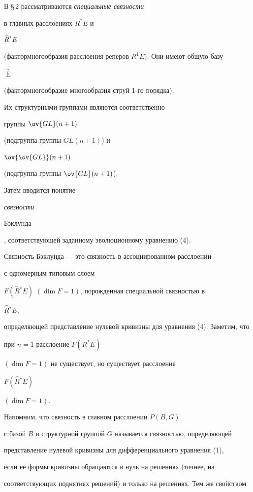 В \S\,2 рассматриваются {\it специальные связности} 


в главных расслоениях $R^*E$ и


$\overset{\frown}{R}{}^*E$


(фактормногообразия расслоения реперов $R^1 E$). Они имеют общую базу


$\mathop{J^1 E}\limits^*$


(фактормногообразие многообразия струй 1-го порядка). 


Их структурными группами являются соответственно


группы $\ov {GL} ({n+1})$


(подгруппа группы $GL ({n+1})$) и 


$\ov{\ov {GL}} ({n+1})$


(подгруппа группы $\ov {GL} ({n+1})$). 


Затем вводится понятие {\it связности


Бэклунда}, соответствующей заданному эволюционному уравнению (4).





Связность Бэклунда --- это связность в ассоциированном расслоении 


с одномерным типовым слоем


$F(\overset{\frown}{R}{}^ *


E)$ $({\dim F=1})$, порожденная специальной связностью в


$\overset{\frown}{R}{}^*E$,


определяющей представление нулевой кривизны для уравнения (4). Заметим, что 


при $n=1$ расслоение $F({R}^ * E)$


$ ({\dim F=1})$ не существует, но существует расслоение


$F(\overset{\frown}{R}{}^*E)$


$({\dim F=1})$.





Напомним, что связность в главном расслоении $P ({B,G})$ 


с базой $B$ и структурной группой $G$ называется связностью, определяющей 


представление нулевой кривизны для дифференциального уравнения (1),


если ее формы кривизны обращаются в нуль на решениях (точнее, на 


соответствующих поднятиях решений) и только на решениях. Тем же свойством 


